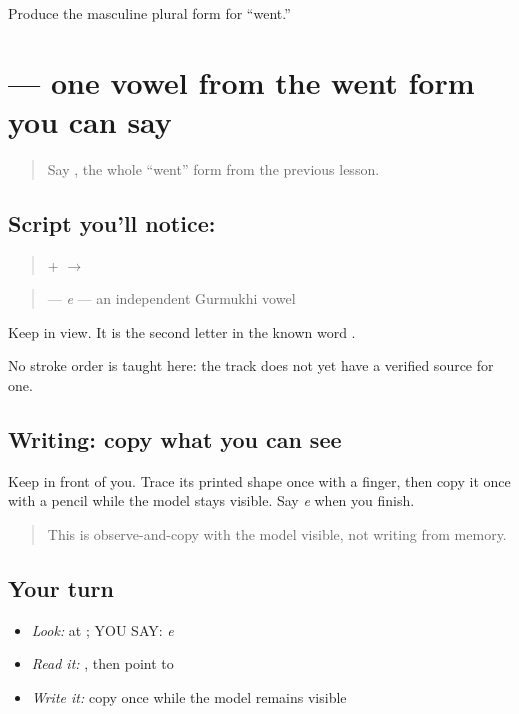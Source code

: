 \begin{tcolorbox}[breakable,colback=teal!4,colframe=teal!35!black,title={Before you move on}]
Produce the masculine plural form for “went.”
\end{tcolorbox}
\section[\texorpdfstring{\pa{ਏ} (e)}{ਏ (e)}]{ — one vowel from the went form you can say}

\label{lesson:PA-C206-e}



\begin{quote}
Say \textbf{}, the whole “went” form from the previous lesson.
\end{quote}

\subsection*{Script you'll notice: }
\begin{quote}
\textbf{} + \textbf{} $\to$ \textbf{}
\end{quote}

\begin{quote}
\textbf{} — \emph{e} — an independent Gurmukhi vowel
\end{quote}

Keep \textbf{} in view. It is the second letter in the known word \textbf{}.

No stroke order is taught here: the track does not yet have a verified source for one.

\subsection*{Writing: copy what you can see}
Keep \textbf{} in front of you. Trace its printed shape once with a finger, then copy it once with a pencil while the model stays visible. Say \emph{e} when you finish.

\begin{quote}
This is observe-and-copy with the model visible, not writing from memory.
\end{quote}

\subsection*{Your turn}
\begin{itemize}
\raggedright
  \item \emph{Look:} at \textbf{}; YOU SAY: \emph{e}
  \item \emph{Read it:} \textbf{}, then point to \textbf{}
  \item \emph{Write it:} copy \textbf{} once while the model remains visible
\end{itemize}


